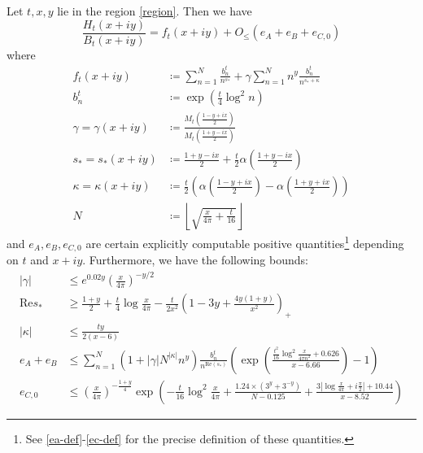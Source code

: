 \begin{theorem}\label{eff}  Let $t,x,y$ lie in the region \eqref{region}.  Then we have
\begin{equation}\label{ratio-form-eff}
\frac{H_t(x+iy)}{B_t(x+iy)} = f_t(x+iy) + O_{\leq}\left( e_A + e_B + e_{C,0} \right)
\end{equation}
where
\begin{align}
f_t(x+iy) &\coloneqq \sum_{n=1}^N \frac{b_n^t}{n^{s_*}} + \gamma \sum_{n=1}^N n^y \frac{b_n^t}{n^{\overline{s_*} + \kappa}}\label{ft-def} \\
b_n^t &\coloneqq \exp( \frac{t}{4} \log^2 n ) \label{bn-def}\\
\gamma = \gamma(x+iy) &\coloneqq \frac{M_t\left(\frac{1-y+ix}{2}\right)}{M_t\left(\frac{1+y-ix}{2}\right)} \label{lambda-def} \\
s_* = s_*(x+iy) &\coloneqq \frac{1+y-ix}{2} +\frac{t}{2} \alpha\left(\frac{1+y-ix}{2}\right) \label{sn-def}\\
\kappa = \kappa(x+iy) &\coloneqq \frac{t}{2} \left(\alpha\left(\frac{1-y+ix}{2}\right) - \alpha\left(\frac{1+y+ix}{2}\right)\right) \label{kappa-def}\\
N &\coloneqq \left\lfloor \sqrt{\frac{x}{4\pi} + \frac{t}{16}} \right\rfloor \label{N-def-main} 
\end{align}
and $e_A, e_B, e_{C,0}$ are certain explicitly computable positive quantities\footnote{See \eqref{ea-def}-\eqref{ec-def} for the precise definition of these quantities.} depending on $t$ and $x+iy$.  Furthermore, we have the following bounds:
\begin{align}
|\gamma| &\leq e^{0.02 y} \left( \frac{x}{4\pi} \right)^{-y/2}  \label{gamma-bound} \\
\mathrm{Re} s_* &\geq \frac{1+y}{2} +\frac{t}{4} \log \frac{x}{4\pi} - \frac{t}{2x^2} \left(1-3y+\frac{4y(1+y)}{x^2}\right)_+  \label{res-bound} \\
|\kappa| &\leq  \frac{ty}{2(x-6)} \label{kappa-bound} \\
e_A + e_B &\leq \sum_{n=1}^N (1 + |\gamma| N^{|\kappa|} n^y) \frac{b_n^t}{n^{\mathrm{Re}(s_*)}} \left( \exp\left( \frac{\frac{t^2}{16} \log^2 \frac{x}{4\pi n^2} + 0.626}{x-6.66} \right)-1 \right) \label{eab-bound} \\
e_{C,0} &\leq \left(\frac{x}{4\pi}\right)^{-\frac{1+y}{4}} \exp\left( - \frac{t}{16} \log^2 \frac{x}{4\pi} + \frac{1.24 \times (3^y+3^{-y})}{N-0.125} + \frac{3 |\log \frac{x}{4\pi} + i \frac{\pi}{2}|+10.44}{x-8.52} \right) \label{ec-bound}
\end{align}
\end{theorem}


